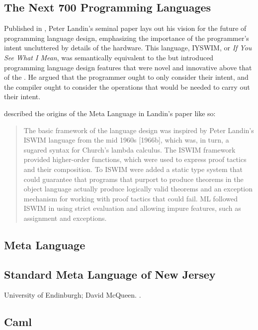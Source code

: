 \subsection{The Next 700 Programming Languages}

Published in \citeyear{landin_next_700_prog_langs_1966},
Peter Landin's seminal paper  lays out his vision for
the future of programming language design, emphasizing the importance of the programmer's intent
uncluttered by details of the hardware.
This language, IYSWIM, or \textit{If You See What I Mean}, was semantically
equivalent to the \lambdacalc but introduced programming language design features
that were novel and innovative above that of the \lambdacalc.
He argued that the programmer ought to only consider their intent, and the compiler ought to
consider the operations that would be needed to carry out their intent.

\citeauthor{hopl_history_of_ml_2020} described the origins of the Meta Language in Landin's paper
like so\cite{hopl_history_of_ml_2020}:

\begin{quotation}
	The basic framework of the language design was inspired by Peter Landin’s ISWIM language
	from the mid 1960s [1966b], which was, in turn, a sugared syntax for Church’s lambda calculus. The
	ISWIM framework provided higher-order functions, which were used to express proof tactics and
	their composition. To ISWIM were added a static type system that could guarantee that programs
	that purport to produce theorems in the object language actually produce logically valid theorems
	and an exception mechanism for working with proof tactics that could fail. ML followed ISWIM in
	using strict evaluation and allowing impure features, such as assignment and exceptions.
\end{quotation}

\subsection{Meta Language}

\subsection{Standard Meta Language of New Jersey}

University of Endinburgh; David McQueen.
.

\subsection{Caml}

